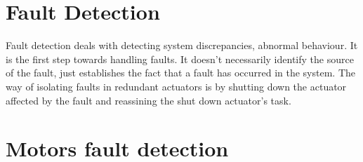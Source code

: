 \section{Fault Detection}

Fault detection deals with detecting system discrepancies, abnormal behaviour. It is the first step towards handling faults. It doesn't necessarily identify the source of the fault, just establishes the fact that a fault has occurred in the system. The way of isolating faults in redundant actuators is by shutting down the actuator affected by the fault and reassining the shut down actuator's task.


\section{Motors fault detection}


